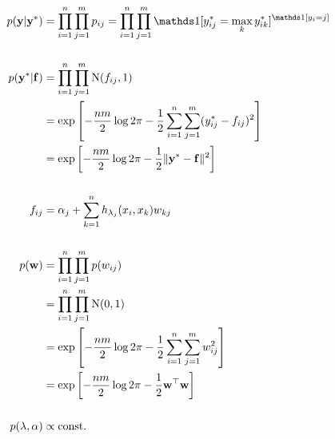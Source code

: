 \begin{align*}
  p(\by|\by^*) &= \prod_{i=1}^n \prod_{j=1}^m p_{ij} 
  = \prod_{i=1}^n \prod_{j=1}^m \ind[y_{ij}^* = \max_k y_{ik}^*]^{\ind[y_i = j]} \\
  \\
  p(\by^*|\bff) &= \prod_{i=1}^n \prod_{j=1}^m \N(f_{ij},1) \\
  &= \exp \left[-\half[nm]\log 2\pi - \half \sum_{i=1}^n \sum_{j=1}^m (y_{ij}^* - f_{ij})^2 \right] \\
  &= \exp \left[-\half[nm]\log 2\pi - \half \norm{\by^* - \bff}^2 \right] \\
  \\
  f_{ij} &= \alpha_j + \sum_{k=1}^n  h_{\lambda_j}(x_i, x_k)w_{kj} \\
  \\
  p(\bw) &= \prod_{i=1}^n \prod_{j=1}^m p(w_{ij}) \\
  &= \prod_{i=1}^n \prod_{j=1}^m \N(0,1) \\
  &= \exp \left[-\half[nm]\log 2\pi - \half \sum_{i=1}^n \sum_{j=1}^m w_{ij}^2 \right] \\
  &= \exp \left[-\half[nm]\log 2\pi - \half \bw^\top \bw \right] \\
  \\
p(\lambda,\alpha) &\propto \const  
\end{align*}
